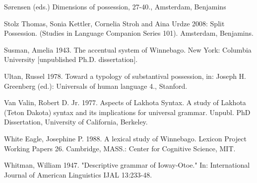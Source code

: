 \documentclass[output=paper]{LSP/langsci}
\begin{document}
\begin{reflist}
Sørensen (eds.) Dimensions of possession, 27-40., Amsterdam, Benjamins

Stolz Thomas, Sonia Kettler, Cornelia Stroh and Aina Urdze 2008: Split Possession. (Studies in Language Companion Series 101). Amsterdam, Benjamins.

Susman, Amelia 1943. The accentual system of Winnebago. New York: Columbia University [unpublished Ph.D. dissertation].

Ultan, Russel 1978. Toward a typology of substantival possession, in: Joseph H. Greenberg (ed.): Universals of human language 4., Stanford.

Van Valin, Robert D. Jr. 1977. Aspects of Lakhota Syntax. A study of Lakhota (Teton Dakota) syntax and its implications for universal grammar. Unpubl. PhD Dissertation, University of California, Berkeley.

White Eagle, Josephine P. 1988. A lexical study of Winnebago. Lexicon Project Working Papers 26. Cambridge, MASS.: Center for Cognitive Science, MIT.

Whitman, William 1947. "Descriptive grammar of Ioway-Otoe." In: International Journal of American Linguistics IJAL 13:233-48.

\end{reflist}
\end{document}
